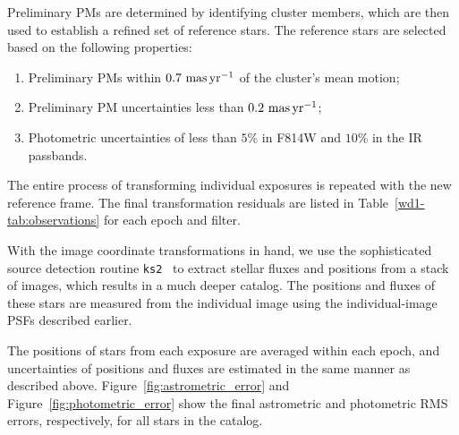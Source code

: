 \documentclass[12pt]{ucsddissertation}
\newcommand{\kstwo}{\texttt{ks2}}
\begin{document}
\begin{CJK*}{UTF8}{gbsn}
Preliminary PMs are determined by identifying cluster members, which are then used to establish a refined set of reference stars. The reference stars are selected based on the following properties: 
\begin{enumerate}[leftmargin=*, label=\roman*., align=left, labelsep=0em, itemsep=0em]
    \item Preliminary PMs within $0.7~\rm mas\,yr^{-1}$ of the cluster's mean motion;
    \item Preliminary PM uncertainties less than $0.2~\rm mas\,yr^{-1}$;
    \item Photometric uncertainties of less than $5\%$ in F814W and $10\%$ in the IR passbands.
\end{enumerate}
The entire process of transforming individual exposures is repeated with the new reference frame. The final transformation residuals are listed in Table~\ref{wd1-tab:observations} for each epoch and filter.

With the image coordinate transformations in hand, we use the sophisticated source detection routine \kstwo~\citep{Anderson-2006, Anderson-2008, Bellini-2017, Bellini-2018} to extract stellar fluxes and positions from a stack of images, which results in a much deeper catalog. The positions and fluxes of these stars are measured from the individual image using the individual-image PSFs described earlier. 

The positions of stars from each exposure are averaged within each epoch, and uncertainties of positions and fluxes are estimated in the same manner as described above. Figure~\ref{fig:astrometric_error} and Figure~\ref{fig:photometric_error} show the final astrometric and photometric RMS errors, respectively, for all stars in the catalog. 


\end{CJK*}
\end{document}
